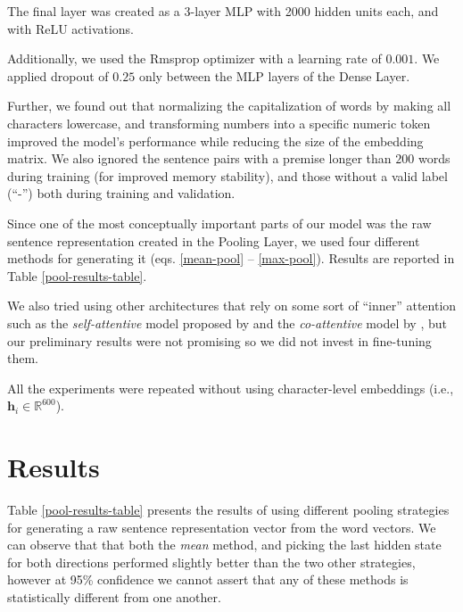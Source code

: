 \documentclass[11pt,letterpaper]{article}
\begin{document}
The final layer was created as a 3-layer MLP with 2000 hidden units each, and with ReLU activations.

Additionally, we used the Rmsprop optimizer with a learning rate of $0.001$. We applied dropout of $0.25$ only between the MLP layers of the Dense Layer.

Further, we found out that normalizing the capitalization of words by making all characters lowercase, and transforming numbers into a specific numeric token improved the model's performance while reducing the size of the embedding matrix. We also ignored the sentence pairs with a premise longer than $200$ words during training (for improved memory stability), and those without a valid label (``-'') both during training and validation.

Since one of the most conceptually important parts of our model was the raw sentence representation created in the Pooling Layer, we used four different methods for generating it (eqs. \ref{mean-pool} -- \ref{max-pool}). Results are reported in Table \ref{pool-results-table}.

We also tried using other architectures that rely on some sort of ``inner'' attention such as the \emph{self-attentive} model proposed by  and the \emph{co-attentive} model by , but our preliminary results were not promising so we did not invest in fine-tuning them.

All the experiments were repeated without using character-level embeddings (i.e., $\bm{h}_i \in \mathbb{R}^{600}$).


\section{Results}

Table \ref{pool-results-table} presents the results of using different pooling strategies for generating a raw sentence representation vector from the word vectors. We can observe that that both the \emph{mean} method, and picking the last hidden state for both directions performed slightly better than the two other strategies, however at 95\% confidence we cannot assert that any of these methods is statistically different from one another.
\end{document}
